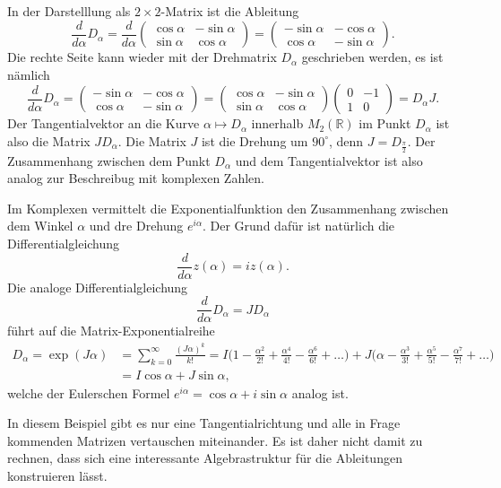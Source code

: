 In der Darstelllung als $2\times 2$-Matrix ist die Ableitung
\[
\frac{d}{d\alpha}D_\alpha
=
\frac{d}{d\alpha}
\begin{pmatrix}
\cos\alpha& -\sin\alpha\\
\sin\alpha&  \cos\alpha
\end{pmatrix}
=
\begin{pmatrix}
-\sin\alpha & -\cos\alpha \\
 \cos\alpha & -\sin\alpha
\end{pmatrix}.
\]
Die rechte Seite kann wieder mit der Drehmatrix $D_\alpha$ geschrieben
werden, es ist nämlich
\[
\frac{d}{d\alpha}D_\alpha
=
\begin{pmatrix}
-\sin\alpha & -\cos\alpha \\
 \cos\alpha & -\sin\alpha
\end{pmatrix}
=
\begin{pmatrix}
\cos\alpha & -\sin\alpha\\
\sin\alpha &  \cos\alpha
\end{pmatrix}
\begin{pmatrix}
0&-1\\
1& 0
\end{pmatrix}
=
D_\alpha J.
\]
Der Tangentialvektor an die Kurve $\alpha\mapsto D_\alpha$ innerhalb
$M_2(\mathbb{R})$ im Punkt $D_\alpha$ ist also die Matrix 
$JD_\alpha$.
Die Matrix $J$ ist die Drehung um $90^\circ$, denn $J=D_{\frac{\pi}2}$.
Der Zusammenhang zwischen dem Punkt $D_\alpha$ und dem Tangentialvektor
ist also analog zur Beschreibug mit komplexen Zahlen.

Im Komplexen vermittelt die Exponentialfunktion den Zusammenhang zwischen
dem Winkel $\alpha$ und dre Drehung $e^{i\alpha}$.
Der Grund dafür ist natürlich die Differentialgleichung
\[
\frac{d}{d\alpha} z(\alpha) =  iz(\alpha).
\]
Die analoge Differentialgleichung 
\[
\frac{d}{d\alpha} D_\alpha = J D_\alpha
\]
führt auf die Matrix-Exponentialreihe
\begin{align*}
D_\alpha
=
\exp (J\alpha)
&=
\sum_{k=0}^\infty \frac{(J\alpha)^k}{k!}
=
I\biggl(
1-\frac{\alpha^2}{2!} + \frac{\alpha^4}{4!} -\frac{\alpha^6}{6!}+\dots
\biggr)
+
J\biggl(
\alpha - \frac{\alpha^3}{3!}
+ \frac{\alpha^5}{5!}
- \frac{\alpha^7}{7!}+\dots
\biggr)
\\
&=
I\cos\alpha
+
J\sin\alpha,
\end{align*}
welche der Eulerschen Formel $e^{i\alpha} = \cos\alpha + i \sin\alpha$
analog ist.

In diesem Beispiel gibt es nur eine Tangentialrichtung und alle in Frage
kommenden Matrizen vertauschen miteinander.
Es ist daher nicht damit zu rechnen, dass sich eine interessante 
Algebrastruktur für die Ableitungen konstruieren lässt.

